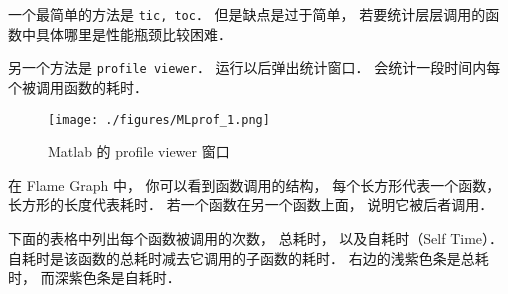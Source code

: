 
\begin{issues}
\issueDraft
\end{issues}


一个最简单的方法是 \verb|tic, toc|． 但是缺点是过于简单， 若要统计层层调用的函数中具体哪里是性能瓶颈比较困难．

另一个方法是 \verb|profile viewer|． 运行以后弹出统计窗口． 会统计一段时间内每个被调用函数的耗时．

\begin{figure}[ht]
\centering
\texttt{[image: ./figures/MLprof\_1.png]}
\caption{Matlab 的 profile viewer 窗口} \label{MLprof_fig1}
\end{figure}

在 Flame Graph 中， 你可以看到函数调用的结构， 每个长方形代表一个函数， 长方形的长度代表耗时． 若一个函数在另一个函数上面， 说明它被后者调用．

下面的表格中列出每个函数被调用的次数， 总耗时， 以及自耗时（Self Time）． 自耗时是该函数的总耗时减去它调用的子函数的耗时． 右边的浅紫色条是总耗时， 而深紫色条是自耗时．
